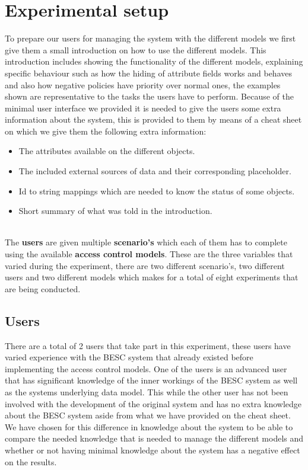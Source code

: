 \section{Experimental setup}
To prepare our users for managing the system with the different models we first give them a small introduction on how to use the different models.
This introduction includes showing the functionality of the different models, explaining specific behaviour such as how the hiding of attribute fields works and behaves and also how negative policies have priority over normal ones, the examples shown are representative to the tasks the users have to perform.
Because of the minimal user interface we provided it is needed to give the users some extra information about the system, this is provided to them by means of a cheat sheet on which we give them the following extra information:
\begin{itemize}
    \item The attributes available on the different objects.
    \item The included external sources of data and their corresponding placeholder.
    \item Id to string mappings which are needed to know the status of some objects.
    \item Short summary of what was told in the introduction.
\end{itemize}
\\
The \textbf{users} are given multiple \textbf{scenario's} which each of them has to complete using the available \textbf{access control models}.
These are the three variables that varied during the experiment, there are two different scenario's, two different users and two different models which makes for a total of eight experiments that are being conducted.

\subsection{Users}
There are a total of 2 users that take part in this experiment, these users have varied experience with the BESC system that already existed before implementing the access control models.
One of the users is an advanced user that has significant knowledge of the inner workings of the BESC system as well as the systems underlying data model.
This while the other user has not been involved with the development of the original system and has no extra knowledge about the BESC system aside from what we have provided on the cheat sheet.
We have chosen for this difference in knowledge about the system to be able to compare the needed knowledge that is needed to manage the different models and whether or not having minimal knowledge about the system has a negative effect on the results. 


